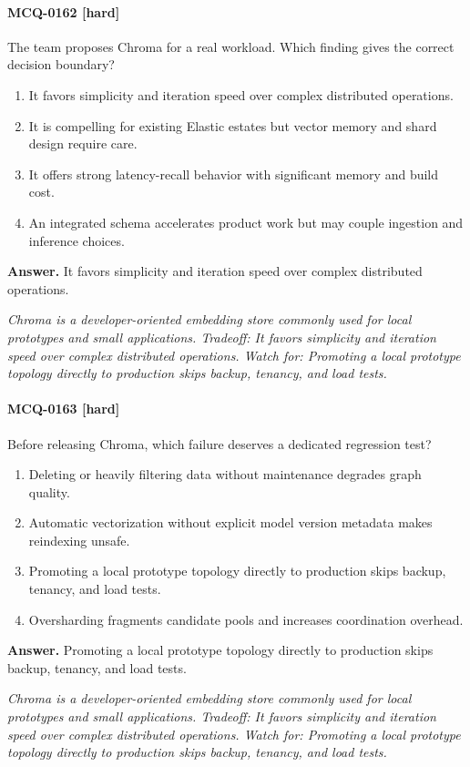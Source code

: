\paragraph{MCQ-0162 [hard]} The team proposes Chroma for a real workload. Which finding gives the correct decision boundary?
\begin{enumerate}[label=\Alph*.]
\item It favors simplicity and iteration speed over complex distributed operations.
\item It is compelling for existing Elastic estates but vector memory and shard design require care.
\item It offers strong latency-recall behavior with significant memory and build cost.
\item An integrated schema accelerates product work but may couple ingestion and inference choices.
\end{enumerate}
\noindent\textbf{Answer.} It favors simplicity and iteration speed over complex distributed operations.
\par\textit{Chroma is a developer-oriented embedding store commonly used for local prototypes and small applications. Tradeoff: It favors simplicity and iteration speed over complex distributed operations. Watch for: Promoting a local prototype topology directly to production skips backup, tenancy, and load tests.}
\paragraph{MCQ-0163 [hard]} Before releasing Chroma, which failure deserves a dedicated regression test?
\begin{enumerate}[label=\Alph*.]
\item Deleting or heavily filtering data without maintenance degrades graph quality.
\item Automatic vectorization without explicit model version metadata makes reindexing unsafe.
\item Promoting a local prototype topology directly to production skips backup, tenancy, and load tests.
\item Oversharding fragments candidate pools and increases coordination overhead.
\end{enumerate}
\noindent\textbf{Answer.} Promoting a local prototype topology directly to production skips backup, tenancy, and load tests.
\par\textit{Chroma is a developer-oriented embedding store commonly used for local prototypes and small applications. Tradeoff: It favors simplicity and iteration speed over complex distributed operations. Watch for: Promoting a local prototype topology directly to production skips backup, tenancy, and load tests.}
